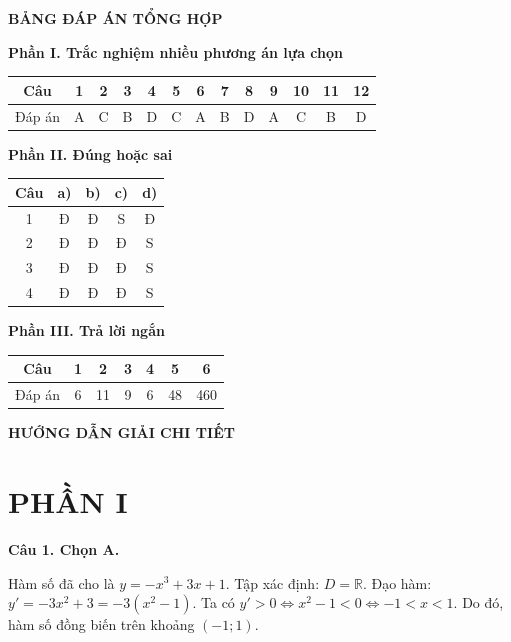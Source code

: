 \documentclass[12pt,a4paper]{article}
\newcommand{\loigiai}[1]{\par\medskip\Needspace{4\baselineskip}\noindent\textbf{#1}\par\nobreak}
\begin{document}
\newpage\pagestyle{answers}
\begin{center}\Large\textbf{BẢNG ĐÁP ÁN TỔNG HỢP}\end{center}
\textbf{Phần I. Trắc nghiệm nhiều phương án lựa chọn}
\begin{center}
\renewcommand{\arraystretch}{1.5}
\begin{tabular}{|c|*{12}{c|}}\hline
Câu & 1&2&3&4&5&6&7&8&9&10&11&12\\\hline
Đáp án & A & C & B & D & C & A & B & D & A & C & B & D \\\hline
\end{tabular}
\end{center}

\textbf{Phần II. Đúng hoặc sai}
\begin{center}
\renewcommand{\arraystretch}{1.4}
\begin{tabular}{|c|c|c|c|c|}\hline
Câu & a) & b) & c) & d)\\\hline
1 & Đ & Đ & S & Đ\\\hline
2 & Đ & Đ & Đ & S\\\hline
3 & Đ & Đ & Đ & S\\\hline
4 & Đ & Đ & Đ & S\\\hline
\end{tabular}
\end{center}

\textbf{Phần III. Trả lời ngắn}
\begin{center}
\renewcommand{\arraystretch}{1.5}
\begin{tabular}{|c|c|c|c|c|c|c|}\hline
Câu & 1 & 2 & 3 & 4 & 5 & 6\\\hline
Đáp án & 6 & 11 & 9 & 6 & 48 & 460 \\\hline
\end{tabular}
\end{center}

\vspace{0.5cm}
\begin{center}
\large\textbf{HƯỚNG DẪN GIẢI CHI TIẾT}
\end{center}

\section*{PHẦN I}

\loigiai{Câu 1. Chọn A.}
Hàm số đã cho là $y=-x^3+3x+1$.
Tập xác định: $D=\mathbb{R}$.
Đạo hàm: $y'=-3x^2+3=-3(x^2-1)$.
Ta có $y'>0 \iff x^2-1 < 0 \iff -1 < x < 1$.
Do đó, hàm số đồng biến trên khoảng $(-1;1)$.
\end{document}
